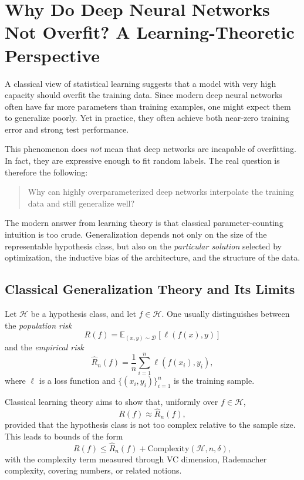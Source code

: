 \section{Why Do Deep Neural Networks Not Overfit? A Learning-Theoretic Perspective}

A classical view of statistical learning suggests that a model with very high capacity should overfit the training data. Since modern deep neural networks often have far more parameters than training examples, one might expect them to generalize poorly. Yet in practice, they often achieve both near-zero training error and strong test performance.

This phenomenon does \emph{not} mean that deep networks are incapable of overfitting. In fact, they are expressive enough to fit random labels. The real question is therefore the following:

\begin{quote}
Why can highly overparameterized deep networks interpolate the training data and still generalize well?
\end{quote}

The modern answer from learning theory is that classical parameter-counting intuition is too crude. Generalization depends not only on the size of the representable hypothesis class, but also on the \emph{particular solution} selected by optimization, the inductive bias of the architecture, and the structure of the data.

\subsection{Classical Generalization Theory and Its Limits}

Let \( \mathcal{H} \) be a hypothesis class, and let \( f \in \mathcal{H} \). One usually distinguishes between the \emph{population risk}
\[
R(f) = \mathbb{E}_{(x,y)\sim \mathcal{D}}[\ell(f(x),y)]
\]
and the \emph{empirical risk}
\[
\hat{R}_n(f) = \frac{1}{n}\sum_{i=1}^n \ell(f(x_i),y_i),
\]
where \( \ell \) is a loss function and \( \{(x_i,y_i)\}_{i=1}^n \) is the training sample.

Classical learning theory aims to show that, uniformly over \( f \in \mathcal{H} \),
\[
R(f) \approx \hat{R}_n(f),
\]
provided that the hypothesis class is not too complex relative to the sample size. This leads to bounds of the form
\[
R(f) \leq \hat{R}_n(f) + \mathrm{Complexity}(\mathcal{H},n,\delta),
\]
with the complexity term measured through VC dimension, Rademacher complexity, covering numbers, or related notions.

